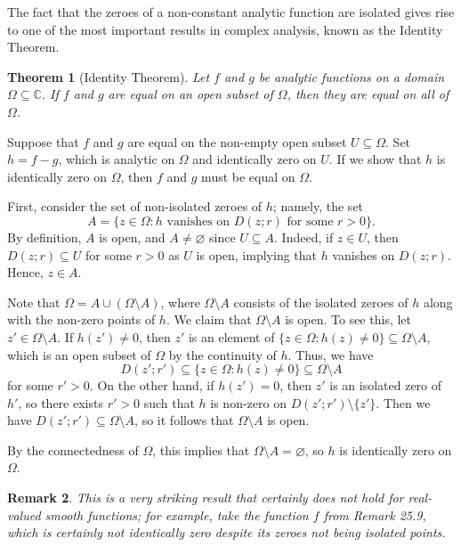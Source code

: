 \documentclass[10pt]{article}
\makeatletter
\newcommand{\C}{\mathbb{C}}
\theoremstyle{newstyle}
\newtheorem{thm}{Theorem}[section]
\newtheorem{remark}[thm]{Remark}
\newenvironment{pf}[1][\proofname]{\par
  \pushQED{\qed}%
  \normalfont \topsep0\p@\relax
  \trivlist
  \item[\hskip\labelsep\scshape
  #1\@addpunct{.}]\ignorespaces
}{%
  \popQED\endtrivlist\@endpefalse
}
\makeatother
\begin{document}
The fact that the zeroes of a non-constant analytic function are isolated gives rise to 
one of the most important results in complex analysis, known as the Identity Theorem. 

\begin{thm}[Identity Theorem]
Let $f$ and $g$ be analytic functions on a domain $\Omega \subseteq \C$. If $f$ and $g$ 
are equal on an open subset of $\Omega$, then they are equal on all of $\Omega$.
\end{thm}
\begin{pf}
Suppose that $f$ and $g$ are equal on the non-empty open subset $U \subseteq \Omega$. 
Set $h = f-g$, which is analytic on $\Omega$ and identically zero on $U$. If we show that 
$h$ is identically zero on $\Omega$, then $f$ and $g$ must be equal on $\Omega$. 

First, consider the set of non-isolated zeroes of $h$; namely, the set 
\[ A = \{z \in \Omega : \text{$h$ vanishes on $D(z; r)$ for some $r > 0$}\}. \]
By definition, $A$ is open, and $A \neq \varnothing$ since $U \subseteq A$. Indeed, if 
$z \in U$, then $D(z; r) \subseteq U$ for some $r > 0$ as $U$ is open, implying that 
$h$ vanishes on $D(z; r)$. Hence, $z \in A$.

Note that $\Omega = A \cup (\Omega \setminus A)$, where $\Omega \setminus A$ consists of the 
isolated zeroes of $h$ along with the non-zero points of $h$. We claim that 
$\Omega \setminus A$ is open. To see this, let $z' \in \Omega \setminus A$. If 
$h(z') \neq 0$, then $z'$ is an element of $\{z \in \Omega : h(z) \neq 0\} \subseteq \Omega \setminus A$,
which is an open subset of $\Omega$ by the continuity of $h$. Thus, we have 
\[ D(z'; r') \subseteq \{z \in \Omega : h(z) \neq 0\} \subseteq \Omega \setminus A \]
for some $r' > 0$. On the other hand, if $h(z') = 0$, then $z'$ is an isolated zero of $h'$, 
so there exists $r' > 0$ such that $h$ is non-zero on $D(z'; r') \setminus \{z'\}$. 
Then we have $D(z'; r') \subseteq \Omega \setminus A$, so it follows that $\Omega \setminus A$ is open. 

By the connectedness of $\Omega$, this implies that $\Omega \setminus A = \varnothing$, so $h$ 
is identically zero on $\Omega$. 
\end{pf}

\begin{remark}
This is a very striking result that certainly does not hold for real-valued smooth functions; 
for example, take the function $f$ from Remark 25.9, which is certainly not identically zero despite
its zeroes not being isolated points. 
\end{remark}
\end{document}
